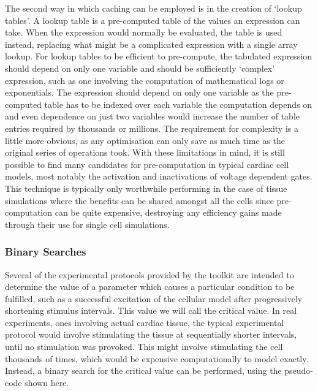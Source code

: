The second way in which caching can be employed is in the creation of `lookup
tables'.  A lookup table is a pre-computed table of the values an expression can
take.  When the expression would normally be evaluated, the table is used
instead, replacing what might be a complicated expression with a single array
lookup.  For lookup tables to be efficient to pre-compute, the tabulated
expression should depend on only one variable and should be sufficiently
`complex' expression, such as one involving the computation of mathematical logs
or exponentials.  The expression should depend on only one variable as the
pre-computed table has to be indexed over each variable the computation depends
on and even dependence on just two variables would increase the number of table
entries required by thousands or millions.  The requirement for complexity is a
little more obvious, as any optimisation can only save as much time as the
original series of operations took.  With these limitations in mind, it is still
possible to find many candidates for pre-computation in typical cardiac cell
models, most notably the activation and inactivations of voltage dependent
gates.  This technique is typically only worthwhile performing in the case of
tissue simulations where the benefits can be shared amongst all the cells since
pre-computation can be quite expensive, destroying any efficiency gains made
through their use for single cell simulations.

\subsubsection{Binary Searches}

Several of the experimental protocols provided by the toolkit are intended to
determine the value of a parameter which causes a particular condition to be
fulfilled, such as a successful excitation of the cellular model after
progressively shortening stimulus intervals.  This value we will call the
critical value. In real experiments, ones involving actual cardiac tissue, the
typical experimental protocol would involve stimulating the tissue at
sequentially shorter intervals, until no stimulation was provoked.  This might
involve stimulating the cell thousands of times, which would be expensive
computationally to model exactly.  Instead, a binary search for the critical
value can be performed, using the pseudo-code shown here.


